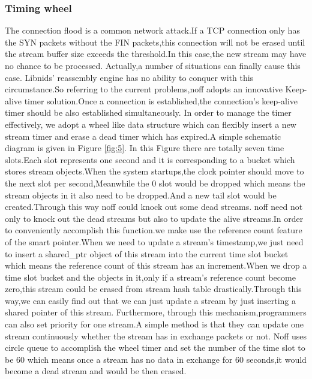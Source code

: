 \documentclass[conference]{IEEEtran}
\begin{document}
\subsubsection{Timing wheel}
The connection flood is a common network attack.If a TCP connection only has the SYN packets without the FIN packets,this connection will not be erased until the stream buffer size exceeds the threshold.In this case,the new stream may have no chance to be processed. Actually,a number of situations can finally cause this case. Libnids' reassembly engine has no ability to conquer with this circumstance.So referring to the current problems,noff adopts an innovative Keep-alive timer solution.Once a connection is established,the connection's keep-alive timer should be also established simultaneously.
\newline\indent In order to manage the timer effectively, we adopt a wheel like data structure\cite{Varghese} which can flexibly insert a new stream timer and erase a dead timer which has expired.A simple schematic diagram is given in Figure \ref{fig:5}. In this Figure there are totally seven time slots.Each slot represents one second and it is corresponding to a bucket which stores stream objects.When the system startups,the clock pointer should move to the next slot per second,Meanwhile the 0 slot would be dropped which means the stream objects in it also need to be dropped.And a new tail slot would be created.Through this way noff could knock out some dead streams.
\newline\indent noff need not only to knock out the dead streams but also to update the alive streams.In order to conveniently accomplish this function.we make use the reference count feature of the smart pointer.When we need to update a stream's timestamp,we just need to insert a shared\_ptr object of this stream into the current time slot bucket which means the reference count of this stream has an increment.When we drop a time slot bucket and the objects in it,only if a stream's reference count become zero,this stream could be erased from stream hash table drastically.Through this way,we can easily find out that we can just update a stream by just inserting a shared pointer of this stream.
\newline\indent Furthermore, through this mechanism,programmers can also set priority for one stream.A simple method is that they can update one stream continuously whether the stream has in exchange packets or not.
\newline\indent Noff uses circle queue to accomplish the wheel timer and set the number of the time slot to be 60 which means once a stream has no data in exchange for 60 seconds,it would become a dead stream and would be then erased.
\end{document}
